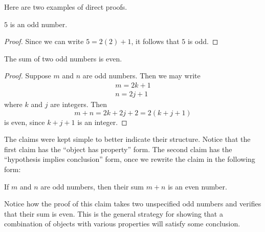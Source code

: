 Here are two examples of direct proofs.
\begin{proposition}
$5$ is an odd number.
\end{proposition}
\begin{proof}
Since we can write $5 = 2(2) + 1$, it follows that $5$ is odd.
\end{proof}

\begin{proposition}
The sum of two odd numbers is even.
\end{proposition}
\begin{proof}
Suppose $m$ and $n$ are odd numbers. Then we may write
\begin{gather*}
m = 2k + 1 \\
n = 2j + 1
\end{gather*}
where $k$ and $j$ are integers. Then
\[m + n = 2k + 2j + 2 = 2(k + j + 1)\]
is even, since $k + j + 1$ is an integer.
\end{proof}

The claims were kept simple to better indicate their structure. Notice that the first claim has the ``object has property'' form. The second claim has the ``hypothesis implies conclusion'' form, once we rewrite the claim in the following form:
\begin{proposition}
If $m$ and $n$ are odd numbers, then their sum $m + n$ is an even number.
\end{proposition}
Notice how the proof of this claim takes two unspecified odd numbers and verifies that their sum is even. This is the general strategy for showing that a combination of objects with various properties will satisfy some conclusion. 